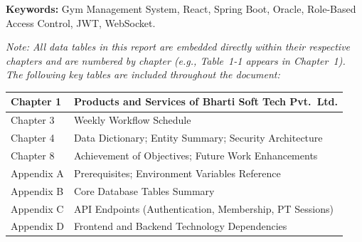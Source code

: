 \documentclass[
  12pt,
  a4paperpaper,
]{report}
\begin{document}
\noindent\textbf{Keywords:} Gym Management System, React, Spring Boot,
Oracle, Role-Based Access Control, JWT, WebSocket.

\vspace*{\fill}

\ClearShipoutPictureBG

\renewcommand{\headrule}{%
  \vspace{-8pt}\noindent\rule{\headwidth}{1.5pt}\vspace{8pt}%
}
\renewcommand{\footrule}{%
  \vspace{-6pt}\noindent\rule{\headwidth}{1.0pt}\vspace{2pt}%
}
\pagestyle{fancy}


\tableofcontents
\vspace{-14pt}



\listoftables

\noindent\textit{Note: All data tables in this report are embedded directly within their respective chapters and are numbered by chapter (e.g., Table~1-1 appears in Chapter~1). The following key tables are included throughout the document:}

\medskip

\noindent

\noindent\begin{tabularx}{\textwidth}{|p{3cm}|X|}
\hline
Chapter 1 & Products and Services of Bharti Soft Tech Pvt.\ Ltd. \\[3pt]
\hline
Chapter 3 & Weekly Workflow Schedule \\[3pt]
\hline
Chapter 4 & Data Dictionary; Entity Summary; Security Architecture \\[3pt]
\hline
Chapter 8 & Achievement of Objectives; Future Work Enhancements \\[3pt]
\hline
Appendix A & Prerequisites; Environment Variables Reference \\[3pt]
\hline
Appendix B & Core Database Tables Summary \\[3pt]
\hline
Appendix C & API Endpoints (Authentication, Membership, PT Sessions) \\[3pt]
\hline
Appendix D & Frontend and Backend Technology Dependencies \\
\hline
\end{tabularx}
\end{document}
